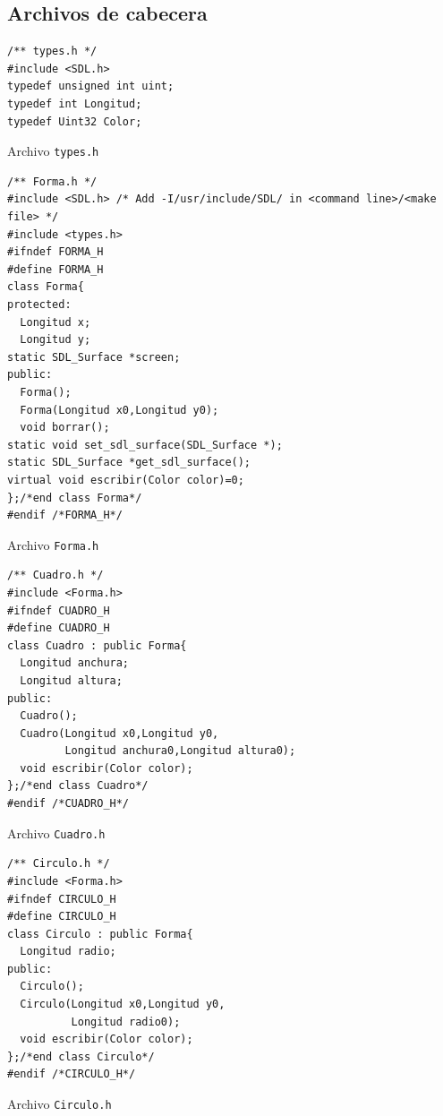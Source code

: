 \documentclass[11pt]{article}
\begin{document}
\subsection*{Archivos de cabecera}
\begin{verbatim}
/** types.h */
#include <SDL.h>
typedef unsigned int uint;
typedef int Longitud;
typedef Uint32 Color;
\end{verbatim}
\begin{center}
Archivo {\tt types.h}
\end{center}

\begin{verbatim}
/** Forma.h */
#include <SDL.h> /* Add -I/usr/include/SDL/ in <command line>/<make file> */
#include <types.h>
#ifndef FORMA_H
#define FORMA_H
class Forma{
protected:
  Longitud x;
  Longitud y;
static SDL_Surface *screen;
public:
  Forma();
  Forma(Longitud x0,Longitud y0);
  void borrar();
static void set_sdl_surface(SDL_Surface *);
static SDL_Surface *get_sdl_surface();
virtual void escribir(Color color)=0;
};/*end class Forma*/
#endif /*FORMA_H*/
\end{verbatim}
\begin{center}
Archivo {\tt Forma.h}
\end{center}

\begin{verbatim}
/** Cuadro.h */
#include <Forma.h>
#ifndef CUADRO_H
#define CUADRO_H
class Cuadro : public Forma{
  Longitud anchura;
  Longitud altura;
public:
  Cuadro();
  Cuadro(Longitud x0,Longitud y0,
         Longitud anchura0,Longitud altura0);
  void escribir(Color color);
};/*end class Cuadro*/
#endif /*CUADRO_H*/
\end{verbatim}
\begin{center}
Archivo {\tt Cuadro.h}
\end{center}

\begin{verbatim}
/** Circulo.h */
#include <Forma.h>
#ifndef CIRCULO_H
#define CIRCULO_H
class Circulo : public Forma{
  Longitud radio;
public:
  Circulo();
  Circulo(Longitud x0,Longitud y0,
          Longitud radio0);
  void escribir(Color color);
};/*end class Circulo*/
#endif /*CIRCULO_H*/
\end{verbatim}
\begin{center}
Archivo {\tt Circulo.h}
\end{center}
\end{document}
